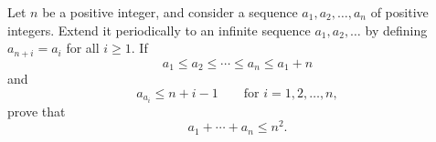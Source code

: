 Let $n$ be a positive integer, and consider a sequence $a_1, a_2, \ldots, a_n$ of positive integers. Extend it periodically to an infinite sequence $a_1, a_2, \ldots$ by defining $a_{n+i} = a_i$ for all $i \geq 1$. If
\[
a_1 \leq a_2 \leq \cdots \leq a_n \leq a_1 + n
\]
and
\[
a_{a_i} \leq n + i - 1 \qquad \text{for } i = 1, 2, \ldots, n,
\]
prove that
\[
a_1 + \cdots + a_n \leq n^2.
\]
